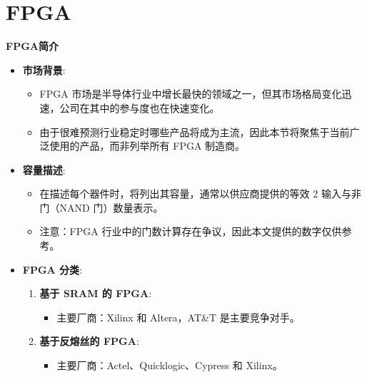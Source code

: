\section{FPGA}

\begin{frame}{\textbf{FPGA简介}}
\label{fpga}
\begin{itemize}
\tightlist
\item
    \textbf{市场背景}:

    \begin{itemize}
    \tightlist
    \item
    FPGA
    市场是半导体行业中增长最快的领域之一，但其市场格局变化迅速，公司在其中的参与度也在快速变化。
    \item
    由于很难预测行业稳定时哪些产品将成为主流，因此本节将聚焦于当前广泛使用的产品，而非列举所有
    FPGA 制造商。
    \end{itemize}
\item
    \textbf{容量描述}:

    \begin{itemize}
    \tightlist
    \item
    在描述每个器件时，将列出其容量，通常以供应商提供的等效 2
    输入与非门（NAND 门）数量表示。
    \item
    注意：FPGA 行业中的门数计算存在争议，因此本文提供的数字仅供参考。
    \end{itemize}
\item
    \textbf{FPGA 分类}:

    \begin{enumerate}
    \tightlist
    \item
    \textbf{基于 SRAM 的 FPGA}:

    \begin{itemize}
    \tightlist
    \item
        主要厂商：Xilinx 和 Altera，AT\&T 是主要竞争对手。
    \end{itemize}
    \item
    \textbf{基于反熔丝的 FPGA}:

    \begin{itemize}
    \tightlist
    \item
        主要厂商：Actel、Quicklogic、Cypress 和 Xilinx。
    \end{itemize}
    \end{enumerate}
\end{itemize}
\end{frame}

